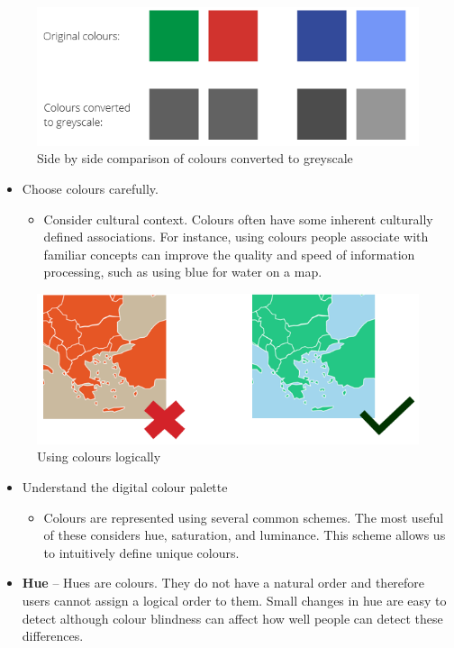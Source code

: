 \documentclass[
]{book}
\providecommand{\tightlist}{%
  \setlength{\itemsep}{0pt}\setlength{\parskip}{0pt}}
\begin{document}
\begin{figure}
\includegraphics[width=1\linewidth]{img/colour_blind_2} \caption{Side by side comparison of colours converted to greyscale}\label{fig:unnamed-chunk-11}
\end{figure}

\begin{itemize}
\item
  Choose colours carefully.

  \begin{itemize}
  \tightlist
  \item
    Consider cultural context. Colours often have some inherent culturally defined associations. For instance, using colours people associate with familiar concepts can improve the quality and speed of information processing, such as using blue for water on a map.
  \end{itemize}
\end{itemize}

\begin{figure}
\includegraphics[width=1\linewidth]{img/cultural_context} \caption{Using colours logically}\label{fig:unnamed-chunk-12}
\end{figure}

\begin{itemize}
\item
  Understand the digital colour palette

  \begin{itemize}
  \tightlist
  \item
    Colours are represented using several common schemes. The most useful of these considers hue, saturation, and luminance. This scheme allows us to intuitively define unique colours.
  \end{itemize}
\item
  \textbf{Hue} -- Hues are colours. They do not have a natural order and therefore users cannot assign a logical order to them. Small changes in hue are easy to detect although colour blindness can affect how well people can detect these differences.
\end{itemize}
\end{document}
